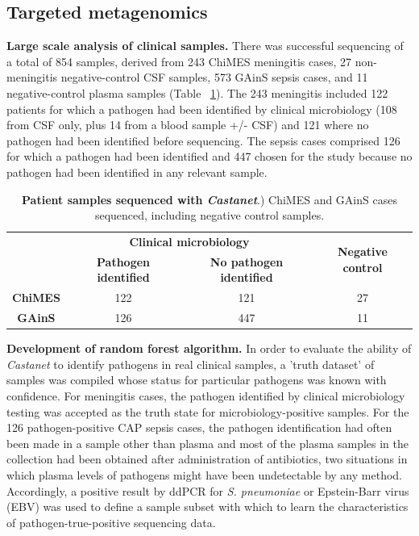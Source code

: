 \subsection{Targeted metagenomics}
\textbf{Large scale analysis of clinical samples.}
There was successful sequencing of a total of 854 samples, derived from 243 ChiMES meningitis cases, 27 non-meningitis negative-control CSF samples, 573 GAinS sepsis cases, and 11 negative-control plasma samples (Table ~\ref{tab:samples}). The 243 meningitis included 122 patients for which a pathogen had been identified by clinical microbiology (108 from CSF only, plus 14 from a blood sample +/- CSF) and 121 where no pathogen had been identified before sequencing. The sepsis cases comprised 126 for which a pathogen had been identified and 447 chosen for the study because no pathogen had been identified in any relevant sample.

\FloatBarrier
\begin{table}[]
\begin{center}
\begin{tabular}{|c|c|c|c|}
\hline
\multirow{2}{*}{} & \multicolumn{2}{c|}{\textbf{Clinical microbiology}}            & \multirow{2}{*}{\textbf{Negative control}} \\ \cline{2-3}
                  & \textbf{Pathogen identified} & \textbf{No pathogen identified} &                                            \\ \hline
\textbf{ChiMES}   & 122                          & 121                             & 27                                         \\ \hline
\textbf{GAinS}    & 126                          & 447                             & 11                                         \\ \hline
\end{tabular}
\end{center}
\smallskip
\caption[Patient samples sequenced with \textit{Castanet}] {\textbf{Patient samples sequenced with \textit{Castanet}}.) ChiMES and GAinS cases sequenced, including negative control samples.} 
\label{tab:samples}
\end{table}

\textbf{Development of random forest algorithm.}
In order to evaluate the ability of \textit{Castanet} to identify pathogens in real clinical samples, a 'truth dataset' of samples was compiled whose status for particular pathogens was known with confidence. For meningitis cases, the pathogen identified by clinical microbiology testing was accepted as the truth state for microbiology-positive samples. For the 126 pathogen-positive CAP sepsis cases, the pathogen identification had often been made in a sample other than plasma and most of the plasma samples in the collection had been obtained after administration of antibiotics, two situations in which plasma levels of pathogens might have been undetectable by any method. Accordingly, a positive result by ddPCR for \textit{S. pneumoniae} or Epstein-Barr virus (EBV) was used to define a sample subset with which to learn the characteristics of pathogen-true-positive sequencing data. 

